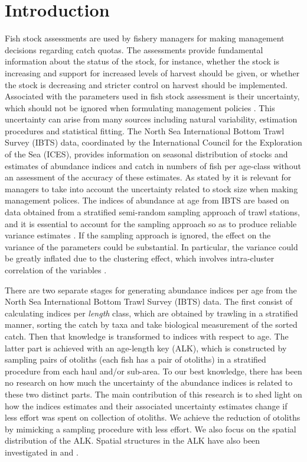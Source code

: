 \documentclass[a4paper 12pt]{article}
\numberwithin{equation}{section}
\begin{document}
\section{Introduction}
Fish stock assessments are used by fishery managers for making management decisions regarding catch quotas. The assessments provide fundamental information about the status of the stock, for instance, whether the stock is increasing and support for increased levels of harvest should be given, or whether the stock is decreasing and stricter control on harvest should be implemented. Associated with the parameters used in fish stock assessment is their uncertainty, which should not be ignored when formulating management policies \citep{ludwig1981measurement, berg2014evaluation}. This uncertainty can arise from many sources including natural variability, estimation procedures and statistical fitting. The North Sea International Bottom Trawl Survey (IBTS) data, coordinated by the International Council for the Exploration of the Sea (ICES), provides information on seasonal distribution of stocks and estimates of abundance indices and catch in numbers of fish per age-class without an assessment of the accuracy of these estimates. As stated by \citet{ludwig1981measurement} it is relevant for managers to take into account the uncertainty related to stock size when making management polices. The indices of abundance at age from IBTS  are based on data obtained from a stratified semi-random sampling approach of trawl stations,  and  it is essential to account for the sampling approach so as to produce reliable variance estimates \citep{lehtonen2004practical}. If the sampling approach is ignored, the effect on the variance  of the parameters could be substantial.  In particular, the variance could be greatly inflated  due to the clustering effect, which involves intra-cluster correlation of the variables \citep{aanes2015efficient, lehtonen2004practical}. 

There are two separate stages for generating abundance indices per age from the North Sea International Bottom Trawl Survey (IBTS) data.  The first consist of calculating indices per \textit{length} class, which are obtained by trawling in a stratified manner, sorting the catch by taxa and take biological measurement of the sorted catch. Then that knowledge is transformed to indices with respect to age. The latter part is achieved with an age-length key (ALK), which is constructed by sampling pairs of otoliths (each fish has a pair of otoliths)  in a stratified procedure from each haul and/or sub-area. To our best knowledge, there has been no research on how much the uncertainty of the abundance indices is related to these two distinct parts. The main contribution of this research is to shed light on how the indices estimates and their associated uncertainty estimates change if less effort was spent on collection of otoliths. We achieve the reduction of otoliths by mimicking a sampling procedure with less effort. We also focus on the spatial distribution of the ALK. Spatial structures in the ALK have also been investigated in \citet{berg2012spatial} and  \citet{hirst2012bayesian}.
\end{document}
